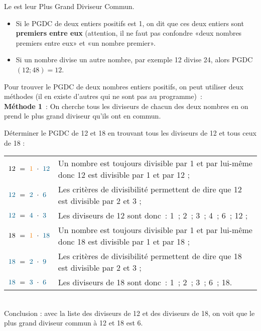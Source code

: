  
 \begin{methode*1}

\begin{aconnaitre}
Le  est leur Plus Grand Diviseur Commun.
\begin{itemize}
 \item Si le PGDC de deux entiers positifs est 1, on dit que ces deux entiers sont \textbf{premiers entre eux} (attention, il ne faut pas confondre «deux nombres premiers entre eux» et «un nombre premier».
 \item Si un nombre divise un autre nombre, par exemple 12 divise 24, alors PGDC $(12 ; 48) = 12$.
 \end{itemize}
\end{aconnaitre}

\vspace{0.5cm}

Pour trouver le PGDC de deux nombres entiers positifs, on peut utiliser deux méthodes (il en existe d'autres qui ne sont pas au programme) : \\[1em]
\textcolor{H1}{\textbf{Méthode 1}} : On cherche tous les diviseurs de chacun des deux nombres en on prend le plus grand diviseur qu'ils ont en commun.

\begin{exemple*1}
Déterminer le PGDC de 12 et 18 en trouvant tous les diviseurs de 12 et tous ceux de 18 : \\[1em]
\begin{tabularx}{\textwidth}{l|X}
 $12 = \textcolor{J1}{1} \cdot \textcolor{A1}{12}$ & Un nombre est toujours divisible par 1 et par lui-même donc 12 est divisible par 1 et par 12 ; \\ 
 $\textcolor{A1}{12 }= \textcolor{A1}{2} \cdot \textcolor{A1}{6}$ & Les critères de divisibilité permettent de dire que 12 est divisible par 2 et 3 ; \\
 $\textcolor{A1}{12} = \textcolor{A1}{4} \cdot \textcolor{A1}{3}$ & Les diviseurs de 12 sont donc : 1 ; 2 ; 3 ; 4 ; 6 ; 12 ; \\
 $18 = \textcolor{J1}{1} \cdot \textcolor{A1}{18}$ & Un nombre est toujours divisible par 1 et par lui-même donc 18 est divisible par 1 et par 18 ; \\ 
 $\textcolor{A1}{18} = \textcolor{A1}{2} \cdot \textcolor{A1}{9}$ & Les critères de divisibilité permettent de dire que 18 est divisible par 2 et 3 ; \\
 $\textcolor{A1}{18} = \textcolor{A1}{3} \cdot \textcolor{A1}{6}$ & Les diviseurs de 18 sont donc : 1 ; 2 ; 3 ; 6 ; 18. \\
\end{tabularx} \\[1em]
Conclusion : avec la liste des diviseurs de 12 et des diviseurs de 18, on voit que le plus grand diviseur commun à 12 et 18 est 6. \\[-2em]
 \end{exemple*1}
 

\end{methode*1}
